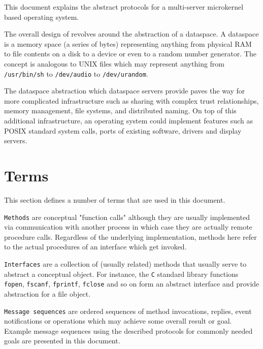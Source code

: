 %
%
%
%

This document explains the abstract protocols for a multi-server microkernel based operating system.

The overall design of  revolves around the abstraction of a dataspace. A dataspace is a memory space (a series of bytes) representing anything from physical RAM to file contents on a disk to a device or even to a random number generator. The concept is analogous to UNIX files which may represent anything from \texttt{/usr/bin/sh} to \texttt{/dev/audio} to \texttt{/dev/urandom}.

The dataspace abstraction which dataspace servers provide paves the way for more complicated infrastructure such as sharing with complex trust relationships, memory management, file systems, and distributed naming. On top of this additional infrastructure, an operating system could implement features such as POSIX standard system calls, ports of existing software, drivers and display servers.

\section{Terms}

This section defines a number of terms that are used in this document.

\texttt{Methods} are conceptual "function calls" although they are usually implemented via communication with another process in which case they are actually remote procedure calls. Regardless of the underlying implementation, methods here refer to the actual procedures of an interface which get invoked.

\texttt{Interfaces} are a collection of (usually related) methods that usually serve to abstract a conceptual object. For instance, the \texttt{C} standard library functions \texttt{fopen}, \texttt{fscanf}, \texttt{fprintf}, \texttt{fclose} and so on form an abstract interface and provide abstraction for a file object.

\texttt{Message sequences} are ordered sequences of method invocations, replies, event notifications or operations which may achieve some overall result or goal. Example message sequences using the described protocols for commonly needed goals are presented in this document.

